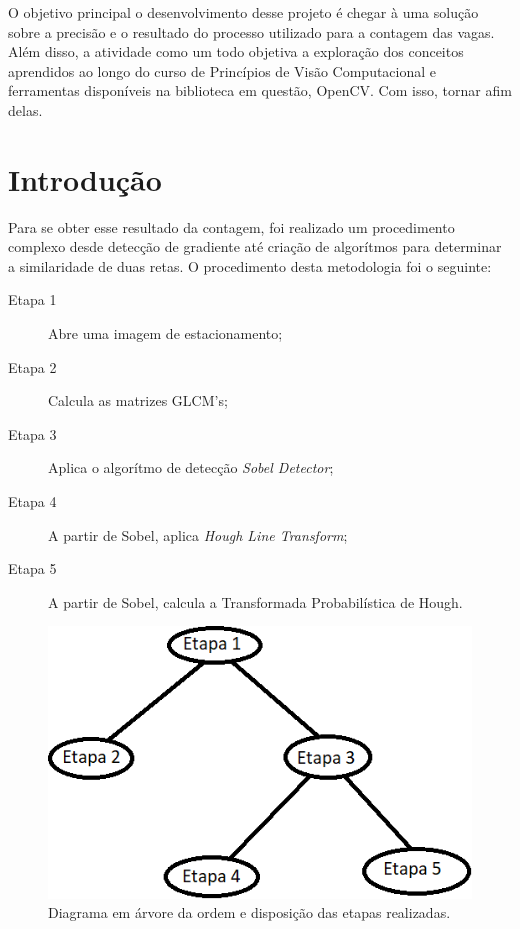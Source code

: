 \documentclass[10pt,twocolumn,letterpaper]{article}
\begin{document}
	O objetivo principal o desenvolvimento desse projeto é chegar à uma solução sobre
a precisão e o resultado do processo utilizado para a contagem das vagas. Além disso, a
atividade como um todo objetiva a exploração dos conceitos aprendidos ao longo do curso
de Princípios de Visão Computacional e ferramentas disponíveis na biblioteca em questão,
OpenCV{\footnotesize \cite{opencv}}. Com isso, tornar afim delas.





\section{Introdução}

	Para se obter esse resultado da contagem, foi realizado um procedimento complexo
desde detecção de gradiente até criação de algorítmos para determinar a similaridade de
duas retas. O procedimento desta metodologia foi o seguinte:


\begin{description}
\item [Etapa 1] Abre uma imagem de estacionamento;
\item [Etapa 2] Calcula as matrizes GLCM's;
\item [Etapa 3] Aplica o algorítmo de detecção {\em Sobel Detector}{\footnotesize \cite{sobel1}};
\item [Etapa 4] A partir de Sobel, aplica {\em Hough Line Transform};
\item [Etapa 5] A partir de Sobel, calcula a Transformada Probabilística de Hough.
\end{description}


\begin{figure}[!htb]
\centering
\includegraphics[scale=0.6]{introducao.png}
\caption{Diagrama em árvore da ordem e disposição das etapas realizadas.}
\label{Rotulo}
\end{figure}
\end{document}
